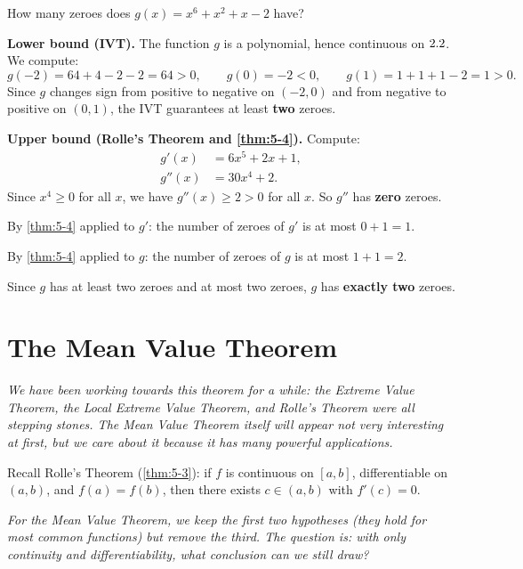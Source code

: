 \begin{example}
\label{ex:5-2}
How many zeroes does $g(x) = x^{6} + x^{2} + x - 2$ have?

\textbf{Lower bound (IVT).}  The function $g$ is a polynomial, hence continuous on $2.2$.  We compute:
\[
  g(-2) = 64 + 4 - 2 - 2 = 64 > 0, \qquad g(0) = -2 < 0, \qquad g(1) = 1 + 1 + 1 - 2 = 1 > 0.
\]
Since $g$ changes sign from positive to negative on $(-2, 0)$ and from negative to positive on $(0, 1)$, the IVT guarantees at least \textbf{two} zeroes.

\textbf{Upper bound (Rolle's Theorem and \cref{thm:5-4}).}  Compute:
\begin{align*}
  g'(x)  &= 6x^{5} + 2x + 1, \\
  g''(x) &= 30x^{4} + 2.
\end{align*}
Since $x^{4} \geq 0$ for all $x$, we have $g''(x) \geq 2 > 0$ for all $x$.  So $g''$ has \textbf{zero} zeroes.

By \cref{thm:5-4} applied to $g'$: the number of zeroes of $g'$ is at most $0 + 1 = 1$.

By \cref{thm:5-4} applied to $g$: the number of zeroes of $g$ is at most $1 + 1 = 2$.

Since $g$ has at least two zeroes and at most two zeroes, $g$ has \textbf{exactly two} zeroes.
\end{example}

\section{The Mean Value Theorem}
\label{sec:5.7}

\textit{We have been working towards this theorem for a while: the Extreme Value Theorem, the Local Extreme Value Theorem, and Rolle's Theorem were all stepping stones.  The Mean Value Theorem itself will appear not very interesting at first, but we care about it because it has many powerful applications.}

Recall Rolle's Theorem (\cref{thm:5-3}): if $f$ is continuous on $[a,b]$, differentiable on $(a,b)$, and $f(a) = f(b)$, then there exists $c \in (a,b)$ with $f'(c) = 0$.

\textit{For the Mean Value Theorem, we keep the first two hypotheses (they hold for most common functions) but remove the third.  The question is: with only continuity and differentiability, what conclusion can we still draw?}

